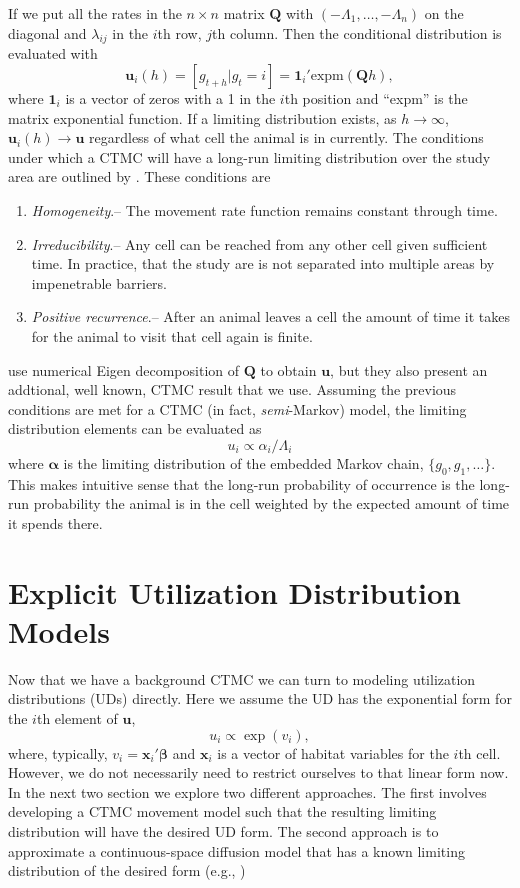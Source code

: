 \documentclass[12pt]{article}
\newcommand{\bx}{\ensuremath{\mathbf{x}}}
\newcommand{\bQ}{\ensuremath{\mathbf{Q}}}
\newcommand{\bu}{\ensuremath{\mathbf{u}}}
\newcommand{\bb}{\ensuremath{\boldsymbol{\beta}}}
\newcommand{\ba}{\ensuremath{\boldsymbol{\alpha}}}
\begin{document}
If we put all the rates in the $n \times n$ matrix $\bQ$ with $(-\Lambda_1,\dots,-\Lambda_n)$ on the diagonal and $\lambda_{ij}$ in the $i$th row, $j$th column. Then the conditional distribution is evaluated with 
\[
\bu_i(h) = [g_{t+h} | g_t=i] = \mathbf{1}_i' \text{expm}\left(\bQ h\right),
\] 
where $\mathbf{1}_i$ is a vector of zeros with a 1 in the $i$th position and ``expm'' is the matrix exponential function. If a limiting distribution exists, as $h \to \infty$, $\bu_i(h) \to \bu$ regardless of what cell the animal is in currently. The conditions under which a CTMC will have a long-run limiting distribution over the study area are outlined by \cite{wilsonestimating}. These conditions are
\begin{enumerate}
\item {\it Homogeneity}.-- The movement rate function remains constant through time. 
\item {\it Irreducibility}.-- Any cell can be reached from any other cell given sufficient time. In practice, that the study are is not separated into multiple areas by impenetrable barriers.
\item {\it Positive recurrence}.-- After an animal leaves a cell the amount of time it takes for the animal to visit that cell again is finite.
\end{enumerate}
\citet{wilsonestimating} use numerical Eigen decomposition of $\bQ$ to obtain $\bu$, but they also present an addtional, well known, CTMC result that we use. Assuming the previous conditions are met for a CTMC (in fact, {\it semi}-Markov) model, the limiting distribution elements can be evaluated as 
\begin{equation}
\label{eq:embed.u}
u_i \propto \alpha_i / \Lambda_i
\end{equation}
where $\ba$ is the limiting distribution of the embedded Markov chain, $\{g_0,g_1,\dots\}$. This makes intuitive sense that the long-run probability of occurrence is the long-run probability the animal is in the cell weighted by the expected amount of time it spends there. 

\section{Explicit Utilization Distribution Models}

Now that we have a background CTMC we can turn to modeling utilization distributions (UDs) directly. Here we assume the UD has the exponential form for the $i$th element of $\bu$,
\[
u_i \propto \exp(v_i),
\] 
where, typically, $v_i = \bx_i'\bb$ and $\bx_i$ is a vector of habitat variables for the $i$th cell. However, we do not necessarily need to restrict ourselves to that linear form now. In the next two section we explore two different approaches. The first involves developing a CTMC movement model such that the resulting limiting distribution will have the desired UD form. The second approach is to approximate a continuous-space diffusion model that has a known limiting distribution of the desired form (e.g., \citealt{xxx})
\end{document}
